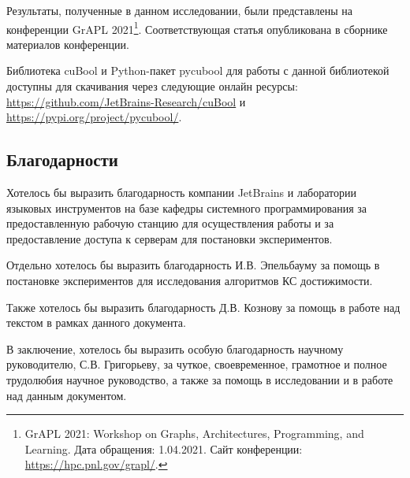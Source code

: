 Результаты, полученные в данном исследовании, были представлены на конференции GrAPL 2021\footnote{GrAPL 2021: Workshop on Graphs, Architectures, Programming, and Learning. Дата обращения: 1.04.2021. Сайт конференции: \url{https://hpc.pnl.gov/grapl/}.}. Соответствующая статья опубликована в сборнике материалов конференции.

Библиотека cuBool и Python-пакет pycubool для работы с данной библиотекой доступны для скачивания через следующие онлайн ресурсы: \url{https://github.com/JetBrains-Research/cuBool} и \url{https://pypi.org/project/pycubool/}.

\subsection*{Благодарности}

Хотелось бы выразить благодарность компании JetBrains и лаборатории языковых инструментов на базе кафедры системного программирования за предоставленную рабочую станцию для осуществления работы и за предоставление доступа к серверам для постановки экспериментов.

Отдельно хотелось бы выразить благодарность И.В. Эпельбауму за помощь в постановке экспериментов для исследования алгоритмов КС достижимости.

Также хотелось бы выразить благодарность Д.В. Кознову за помощь в работе над текстом в рамках данного документа.

В заключение, хотелось бы выразить особую благодарность научному руководителю, С.В. Григорьеву, за чуткое, своевременное, грамотное и полное трудолюбия научное руководство, а также за помощь в исследовании и в работе над данным документом. 

